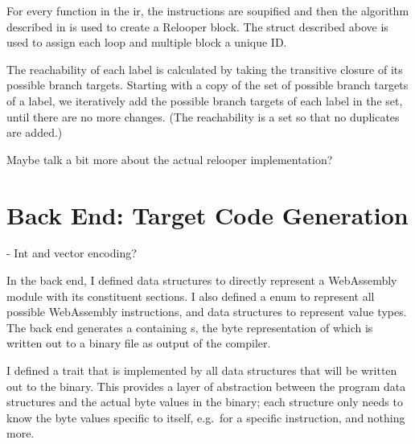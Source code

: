 \documentclass[00-main.tex]{subfiles}
\begin{document}
For every function in the \gls{ir}, the instructions are soupified and then the algorithm described in  is used to create a Relooper block.
The  struct described above is used to assign each loop and multiple block a unique ID\@.

The reachability of each label is calculated by taking the transitive closure of its possible branch targets.
Starting with a copy of the set of possible branch targets of a label, we iteratively add the possible branch targets of each label in the set, until there are no more changes.
(The reachability is a set so that no duplicates are added.)

\begin{mrwComment}
  Maybe talk a bit more about the actual relooper implementation?
\end{mrwComment}

\section{Back End: Target Code Generation}

\begin{mrwComment}
- Int and vector encoding?
\end{mrwComment}

In the back end, I defined data structures to directly represent a WebAssembly module with its constituent sections.
I also defined a  enum to represent all possible WebAssembly instructions, and data structures to represent value types.
The back end generates a  containing s, the byte representation of which is written out to a binary file as output of the compiler.

I defined a  trait that is implemented by all data structures that will be written out to the binary.
This provides a layer of abstraction between the program data structures and the actual byte values in the binary; each structure only needs to know the byte values specific to itself, e.g.\ for a specific instruction, and nothing more.
\end{document}
